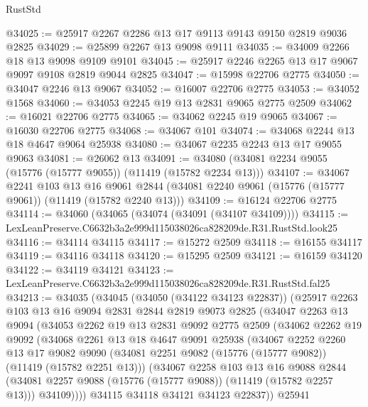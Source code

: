 \begin{lexlean}{RustStd}
\begin{coremodule}
@34025 := @25917 @2267 @2286 @13 @17 @9113 @9143 @9150 @2819 @9036 @2825
@34029 := @25899 @2267 @13 @9098 @9111
@34035 := @34009 @2266 @18 @13 @9098 @9109 @9101
@34045 := @25917 @2246 @2265 @13 @17 @9067 @9097 @9108 @2819 @9044 @2825
@34047 := @15998 @22706 @2775
@34050 := @34047 @2246 @13 @9067
@34052 := @16007 @22706 @2775
@34053 := @34052 @1568
@34060 := @34053 @2245 @19 @13 @2831 @9065 @2775 @2509
@34062 := @16021 @22706 @2775
@34065 := @34062 @2245 @19 @9065
@34067 := @16030 @22706 @2775
@34068 := @34067 @101
@34074 := @34068 @2244 @13 @18 @4647 @9064 @25938
@34080 := @34067 @2235 @2243 @13 @17 @9055 @9063
@34081 := @26062 @13
@34091 := @34080 (@34081 @2234 @9055 (@15776 (@15777 @9055)) (@11419 (@15782 @2234 @13)))
@34107 := @34067
    @2241
    @103
    @13
    @16
    @9061
    @2844
    (@34081 @2240 @9061 (@15776 (@15777 @9061)) (@11419 (@15782 @2240 @13)))
@34109 := @16124 @22706 @2775
@34114 := @34060 (@34065 (@34074 (@34091 (@34107 @34109))))
@34115 := LexLeanPreserve.C6632b3a2e999d115038026ca828209de.R31.RustStd.look25
@34116 := @34114 @34115
@34117 := @15272 @2509
@34118 := @16155 @34117
@34119 := @34116 @34118
@34120 := @15295 @2509
@34121 := @16159 @34120
@34122 := @34119 @34121
@34123 := LexLeanPreserve.C6632b3a2e999d115038026ca828209de.R31.RustStd.fal25
@34213 := @34035
    (@34045
      (@34050 (@34122 @34123 @22837))
      (@25917
        @2263
        @103
        @13
        @16
        @9094
        @2831
        @2844
        @2819
        @9073
        @2825
        (@34047
          @2263
          @13
          @9094
          (@34053
            @2262
            @19
            @13
            @2831
            @9092
            @2775
            @2509
            (@34062
              @2262
              @19
              @9092
              (@34068
                @2261
                @13
                @18
                @4647
                @9091
                @25938
                (@34067
                  @2252
                  @2260
                  @13
                  @17
                  @9082
                  @9090
                  (@34081 @2251 @9082 (@15776 (@15777 @9082)) (@11419 (@15782 @2251 @13)))
                  (@34067
                    @2258
                    @103
                    @13
                    @16
                    @9088
                    @2844
                    (@34081 @2257 @9088 (@15776 (@15777 @9088)) (@11419 (@15782 @2257 @13)))
                    @34109))))
            @34115
            @34118
            @34121
            @34123
            @22837))
        @25941

\end{coremodule}
\end{lexlean}
